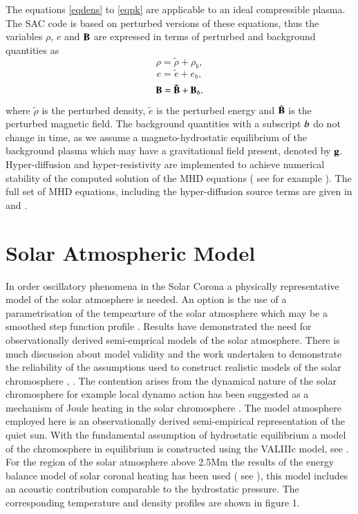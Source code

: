 \documentclass[authoryear,final,1p]{elsarticle}
\begin{document}
The equations \eqref{eqdens} to \eqref{eqpk} are applicable to an ideal compressible plasma. The SAC code is based on perturbed versions of these equations, thus the variables $\rho $, $e$ and  $\bf B$ are expressed in terms of perturbed and background quantities as
\begin{equation}
\rho = \tilde{\rho}+\rho _{b},
\end{equation}
\begin{equation}
e = \tilde{e}+e _{b},
\end{equation}
\begin{equation}
\bf B = \tilde{\bf B}+{\bf B}_{\it{b}}.
\end{equation}
where $\tilde{\rho}$ is the  perturbed density,  $\tilde{e}$ is the perturbed energy and $\tilde{\bf B}$  is the perturbed magnetic field. The background quantities with a subscript $\it{b}$ do not change in time, as we assume a magneto-hydrostatic equilibrium of the background plasma which may have a gravitational field present, denoted by $\bf g$. Hyper-diffusion and hyper-resistivity are implemented to achieve numerical stability of the computed solution of the MHD equations ( see for example \citet{Caunt2001}).  The full set of MHD equations, including the hyper-diffusion source terms are given in \citet{Griffiths2015} and \citet{Shelyag2008}.











\section{Solar Atmospheric Model}
In order oscillatory phenomena in the Solar Corona a physically representative model of the solar atmosphere is needed. An option is the use of a parametrisation of the tempearture of the solar atmosphere which may be a smoothed step function profile  \citet{Murawski2010}. Results have demonstrated the need for observationally derived semi-emprical models of the solar atmosphere. There is much discussion about model validity and the work undertaken to demonstrate the reliability of the assumptions used to construct realistic models of the solar chromosphere \citet{Carlsson1995}, \citet{Kalkofen2012}. The contention arises from the dynamical nature of the solar chromosphere for example local dynamo action has been suggested as a mechanism of Joule heating in the solar chromosphere \citet{Leenaarts2011}. The model atmosphere employed here is an observationally derived semi-empirical representation of the quiet sun. With the fundamental assumption of hydrostatic equilibrium a model of the chromosphere in equilibrium is constructed using the VALIIIc model, see \citet{Vernazza1981}. For the region of the solar atmosphere above 2.5Mm the results of the energy balance model of solar coronal heating has been used  ( see \citet{McWhirter1975}), this model includes an acoustic contribution comparable to the hydrostatic pressure. The corresponding temperature and density profiles are shown in figure 1.
\end{document}
